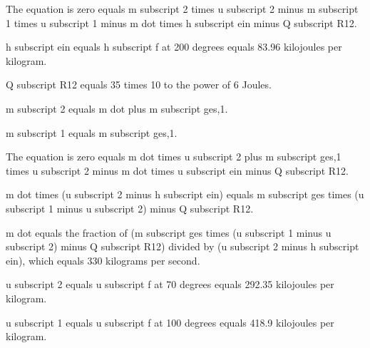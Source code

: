 The equation is zero equals m subscript 2 times u subscript 2 minus m subscript 1 times u subscript 1 minus m dot times h subscript ein minus Q subscript R12.

h subscript ein equals h subscript f at 200 degrees equals 83.96 kilojoules per kilogram.

Q subscript R12 equals 35 times 10 to the power of 6 Joules.

m subscript 2 equals m dot plus m subscript ges,1.

m subscript 1 equals m subscript ges,1.

The equation is zero equals m dot times u subscript 2 plus m subscript ges,1 times u subscript 2 minus m dot times u subscript ein minus Q subscript R12.

m dot times (u subscript 2 minus h subscript ein) equals m subscript ges times (u subscript 1 minus u subscript 2) minus Q subscript R12.

m dot equals the fraction of (m subscript ges times (u subscript 1 minus u subscript 2) minus Q subscript R12) divided by (u subscript 2 minus h subscript ein), which equals 330 kilograms per second.

u subscript 2 equals u subscript f at 70 degrees equals 292.35 kilojoules per kilogram.

u subscript 1 equals u subscript f at 100 degrees equals 418.9 kilojoules per kilogram.